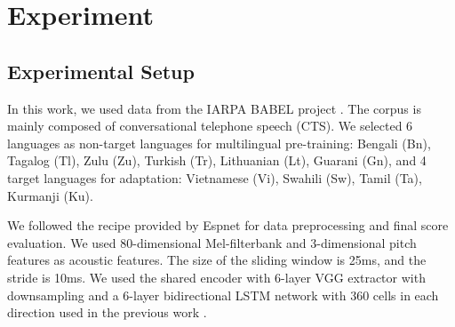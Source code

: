 \section{Experiment}
\label{sec:exp}

\subsection{Experimental Setup}
\label{ssec:exp-setup}
In this work, we used data from the IARPA BABEL project \cite{gales2014speech}. The corpus is mainly composed of conversational telephone speech (CTS). We selected 6 languages as non-target languages for multilingual pre-training: Bengali (Bn), Tagalog (Tl), Zulu (Zu), Turkish (Tr), Lithuanian (Lt), Guarani (Gn), and 4 target languages for adaptation: Vietnamese (Vi), Swahili (Sw), Tamil (Ta), Kurmanji (Ku). 

We followed the recipe provided by Espnet \cite{watanabe2018espnet} for data preprocessing and final score evaluation.  We used 80-dimensional Mel-filterbank and 3-dimensional pitch features as acoustic features. The size of the sliding window is 25ms, and the stride is 10ms. We used the shared encoder with 6-layer VGG extractor with downsampling and a 6-layer bidirectional LSTM network with 360 cells in each direction used in the previous work \cite{dalmia2018sequence}.
\vspace{-5pt}


